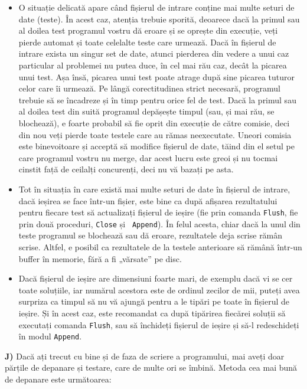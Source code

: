 \begin{itemize}
\item O situație delicată apare când fișierul de intrare conține mai multe
  seturi de date (teste). În acest caz, atenția trebuie sporită, deoarece dacă
  la primul sau al doilea test programul vostru dă eroare și se oprește din
  execuție, veți pierde automat și toate celelalte teste care urmează. Dacă în
  fișierul de intrare exista un singur set de date, atunci pierderea din
  vedere a unui caz particular al problemei nu putea duce, în cel mai rău caz,
  decât la picarea unui test. Așa însă, picarea unui test poate atrage după
  sine picarea tuturor celor care îi urmează. Pe lângă corectitudinea strict
  necesară, programul trebuie să se încadreze și în timp pentru orice fel de
  test. Dacă la primul sau al doilea test din suită programul depășește timpul
  (sau, și mai rău, se blochează), e foarte probabil să fie oprit din execuție
  de către comisie, deci din nou veți pierde toate testele care au rămas
  neexecutate. Uneori comisia este binevoitoare și acceptă să modifice
  fișierul de date, tăind din el setul pe care programul vostru nu merge, dar
  acest lucru este greoi și nu tocmai cinstit față de ceilalți concurenți,
  deci nu vă bazați pe asta.
  
\item Tot în situația în care există mai multe seturi de date în fișierul de
  intrare, dacă ieșirea se face într-un fișier, este bine ca după afișarea
  rezultatului pentru fiecare test să actualizați fișierul de ieșire (fie prin
  comanda {\tt Flush}, fie prin două proceduri, {\tt Close} și {\tt
    Append}). În felul acesta, chiar dacă la unul din teste programul se
  blochează sau dă eroare, rezultatele deja scrise rămân scrise. Altfel, e
  posibil ca rezultatele de la testele anterioare să rămână într-un buffer în
  memorie, fără a fi „vărsate” pe disc.
  
\item Dacă fișierul de ieșire are dimensiuni foarte mari, de exemplu dacă vi
  se cer toate soluțiile, iar numărul acestora este de ordinul zecilor de mii,
  puteți avea surpriza ca timpul să nu vă ajungă pentru a le tipări pe toate
  în fișierul de ieșire. Și în acest caz, este recomandat ca după tipărirea
  fiecărei soluții să executați comanda {\tt Flush}, sau să închideți fișierul
  de ieșire și să-l redeschideți în modul {\tt Append}.
  
\end{itemize}

{\bf J)} Dacă ați trecut cu bine și de faza de scriere a programului, mai
aveți doar părțile de depanare și testare, care de multe ori se îmbină. Metoda
cea mai bună de depanare este următoarea:

